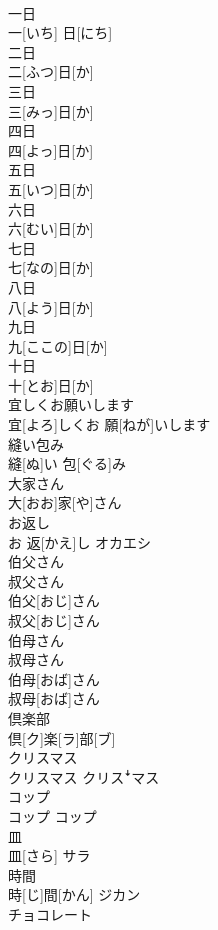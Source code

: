 \documentclass[8pt]{extreport}
\begin{document}
\begin{CJK}{UTF8}{min}
\\	一日 
\\	一[いち] 日[にち] 
\\	二日 
\\	二[ふつ]日[か] 
\\	三日 
\\	三[みっ]日[か] 
\\	四日 
\\	四[よっ]日[か] 
\\	五日 
\\	五[いつ]日[か] 
\\	六日 
\\	六[むい]日[か] 
\\	七日 
\\	七[なの]日[か] 
\\	八日 
\\	八[よう]日[か] 
\\	九日 
\\	九[ここの]日[か] 
\\	十日 
\\	十[とお]日[か] 
\\	宜しくお願いします	
\\	宜[よろ]しくお 願[ねが]いします	
\\	縫い包み	
\\	縫[ぬ]い 包[ぐる]み	
\\	大家さん	
\\	大[おお]家[や]さん	
\\	お返し	
\\	お 返[かえ]し	オカエシ
\\	伯父さん 
\\	叔父さん	
\\	伯父[おじ]さん 
\\	叔父[おじ]さん	
\\	伯母さん 
\\	叔母さん	
\\	伯母[おば]さん 
\\	叔母[おば]さん	
\\	倶楽部	
\\	倶[ク]楽[ラ]部[ブ]	
\\	クリスマス	
\\	クリスマス	クリスꜜマス
\\	コップ	
\\	コップ	コップ
\\	皿	
\\	皿[さら]	サラ
\\	時間	
\\	時[じ]間[かん]	ジカン
\\	チョコレート	

\end{CJK}
\end{document}
